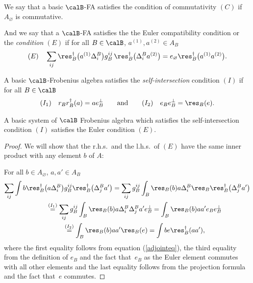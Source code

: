 \begin{df}
\label{Eulerdef}
We say that a basic $\calB$-FA  satisf\/ies the condition of commutativity $(C)$ if $A_{\varnothing}$ is commutative.

And we say that a $\calB$-FA satisf\/ies the
the Euler compatibility condition or the {\em condition $(E)$} if for all $B\in \calB$, $a^{(1)},a^{(2)}\in A_B$
\begin{equation*}
(E) \quad \sum_{ij}\res_B^{\dagger}\big(a^{(1)}\Delta^B_i\big) g^{ij}_B
 \,  \res_B^{\dagger}\big(\Delta^B_ia^{(2)}\big)=e_{\varnothing}\res_B^{\dagger}\big(a^{(1)}a^{(2)}\big).
\end{equation*}
\end{df}


\begin{df}
\label{selfdef}
A basic $\calB$-Frobenius algebra satisf\/ies  the {\em self-intersection} condition $(I)$
if for all $B\in \calB$
\begin{gather*}
(I_1) \quad r_{B}r^{\dagger}_{B}  (a)=  a e^{\perp}_{B} \qquad \text{and}\qquad
(I_2) \quad  e_Be^{\perp}_B =  \res_B(e).
\end{gather*}
\end{df}



\begin{prop}A  basic system of  $\calB$ Frobenius algebra which satisfies the self-intersection condition $(I)$ satisfies the Euler condition $(E)$.
\end{prop}

\begin{proof} We will show that the r.h.s.\ and the l.h.s.\ of $(E)$ have
the same inner product with any element $b$ of $A$:

For all $b\in A_{\varnothing}$, $a, a'\in A_B$
\begin{gather*} \sum_{ij} \int b  \res_B^{\dagger}\big(a\Delta^{B}_i\big)
g_{B}^{ij}  \res_B^{\dagger}\big(\Delta^{B}_j a'\big)
 = \sum_{ij}g_{B}^{ij}
 \int_B \res_{B}(b)a\Delta^{B}_i
 \res_{B}\res_B^{\dagger}\big(\Delta^{B}_ja'\big) \\
\qquad{}  \stackrel{(I_1)}{=} \sum_{ij}g_{B}^{ij}
 \int_B \res_{B}(b)a\Delta^{B}_i \Delta^{B}_j
 a'e_{B}^{\perp}
 =
 \int_B \res_{B}(b)aa' e_B e_B^{\perp}\\
\qquad{} \stackrel{(I_2)}{=} \int_B \res_{B}(b)aa'\res_B(e)
 = \int b  e\res_B^{\dagger}(aa'),
\end{gather*}
where the f\/irst   equality follows from equation (\ref{adjointeq}),
the third equality from the def\/inition of $e_B$ and the fact that~$e_B$ as the Euler element commutes with all other elements and the
last equality follows from the projection formula and the fact that~$e$ commutes.
\end{proof}



